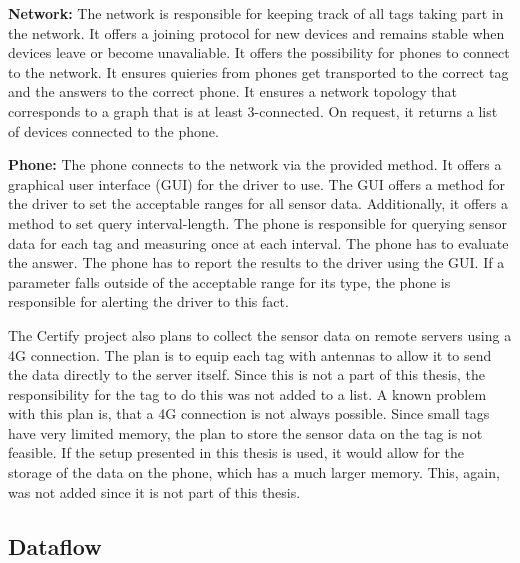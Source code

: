 \textbf{Network:} The network is responsible for keeping track of all tags taking part in the network. 
It offers a joining protocol for new devices and remains stable when devices leave or become unavaliable. 
It offers the possibility for phones to connect to the network. 
It ensures quieries from phones get transported to the correct tag and the answers to the correct phone.
It ensures a network topology that corresponds to a graph that is at least 3-connected.
On request, it returns a list of devices connected to the phone.

\textbf{Phone:} The phone connects to the network via the provided method.
It offers a graphical user interface (GUI) for the driver to use.
The GUI offers a method for the driver to set the acceptable ranges for all sensor data.
Additionally, it offers a method to set query interval-length.
The phone is responsible for querying sensor data for each tag and measuring once at each interval.
The phone has to evaluate the answer.
The phone has to report the results to the driver using the GUI.
If a parameter falls outside of the acceptable range for its type, the phone is responsible for alerting the driver to this fact.

The Certify project also plans to collect the sensor data on remote servers using a 4G connection.
The plan is to equip each tag with antennas to allow it to send the data directly to the server itself.
Since this is not a part of this thesis, the responsibility for the tag to do this was not added to a list.
A known problem with this plan is, that a 4G connection is not always possible.
Since small tags have very limited memory, the plan to store the sensor data on the tag is not feasible.
If the setup presented in this thesis is used, it would allow for the storage of the data on the phone, which has a much larger memory.
This, again, was not added since it is not part of this thesis.


\subsection{Dataflow}
\label{ss:dataflow}

